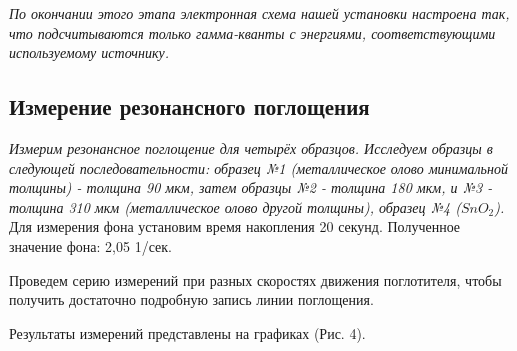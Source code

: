\documentclass[a4paper,12pt]{article} %
\begin{document}
\noindent \textit{По окончании этого этапа электронная схема нашей установки настроена так, что подсчитываются только гамма-кванты с энергиями, соответствующими используемому источнику.}

\subsection{Измерение резонансного поглощения}

\textit{Измерим резонансное поглощение для четырёх образцов. Исследуем образцы в следующей последовательности: образец №1 (металлическое олово минимальной толщины) - толщина 90 мкм, затем образцы №2 - толщина 180 мкм, и №3 - толщина 310 мкм (металлическое олово другой толщины), образец №4 ($SnO_2$).}
\\

\noindent Для измерения фона установим время
накопления 20 секунд. Полученное значение фона: 2,05 1/сек.

\noindent Проведем серию измерений при разных скоростях движения поглотителя, чтобы
получить достаточно подробную запись линии поглощения. 

\noindent Результаты измерений представлены на графиках (Рис. 4).
\end{document}
